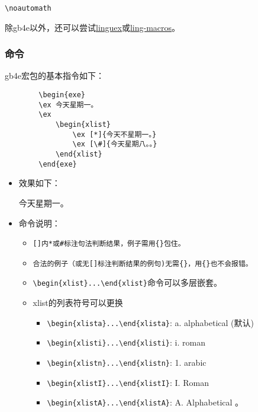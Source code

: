 \documentclass[a4paper,12pt]{article}
\begin{document}
\verb|\noautomath|

除gb4e以外，还可以尝试\href{https://www.ctan.org/pkg/linguex}{linguex}或\href{https://ctan.org/pkg/ling-macros}{ling-macros}。


\subsubsection{命令}

gb4e宏包的基本指令如下：
	\begin{Verbatim}
		\begin{exe}
		\ex 今天星期一。
		\ex 
			\begin{xlist}
				\ex [*]{今天不星期一。}
				\ex [\#]{今天星期八。。}
			\end{xlist}
		\end{exe}
\end{Verbatim}

\begin{itemize}
	\item 效果如下：
	\begin{exe}
		\ex 今天星期一。
		\ex 
		\begin{xlist}
			\ex [*]{今天不星期一。}
		\end{xlist}
	\end{exe}
	\item 命令说明：
	\begin{itemize}
		\item \verb|[]内*或#标注句法判断结果，例子需用{}包住。|
		\item \verb|合法的例子（或无[]标注判断结果的例句)无需{}，用{}也不会报错。|
		\item \verb|\begin{xlist}...\end{xlist}|命令可以多层嵌套。
		\item xlist的列表符号可以更换
			\begin{itemize}
				\item \verb|\begin{xlista}...\end{xlista}|: a.  alphabetical (默认)
				\item \verb|\begin{xlisti}...\end{xlisti}|: i. roman
				\item \verb|\begin{xlistn}...\end{xlistn}|: 1. arabic
				\item \verb|\begin{xlistI}...\end{xlistI}|: I. Roman
				\item \verb|\begin{xlistA}...\end{xlistA}|: A. Alphabetical
。			\end{itemize}
	\end{itemize}
\end{itemize}
\end{document}
